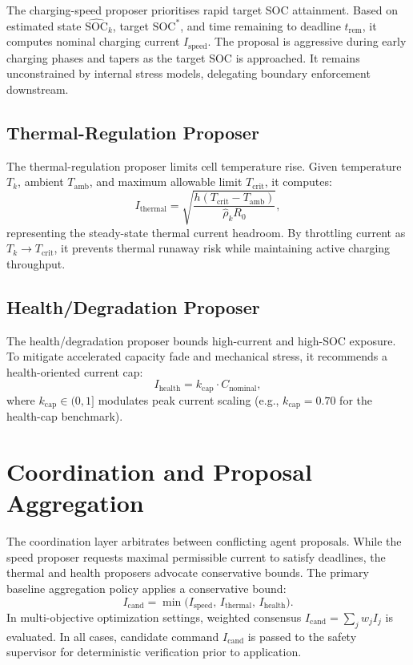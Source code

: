 The charging-speed proposer prioritises rapid target SOC attainment. Based on estimated state $\widehat{\mathrm{SOC}}_k$, target $\mathrm{SOC}^{*}$, and time remaining to deadline $t_{\mathrm{rem}}$, it computes nominal charging current $I_{\mathrm{speed}}$. The proposal is aggressive during early charging phases and tapers as the target SOC is approached. It remains unconstrained by internal stress models, delegating boundary enforcement downstream.

\subsection{Thermal-Regulation Proposer}
\label{subsec:ch5_thermal_agent}

The thermal-regulation proposer limits cell temperature rise. Given temperature $T_k$, ambient $T_{\mathrm{amb}}$, and maximum allowable limit $T_{\mathrm{crit}}$, it computes:
\begin{equation}
  I_{\mathrm{thermal}} = \sqrt{\frac{h (T_{\mathrm{crit}} - T_{\mathrm{amb}})}{\hat{\rho}_k R_0}},
\end{equation}
representing the steady-state thermal current headroom. By throttling current as $T_k \to T_{\mathrm{crit}}$, it prevents thermal runaway risk while maintaining active charging throughput.

\subsection{Health/Degradation Proposer}
\label{subsec:ch5_health_agent}

The health/degradation proposer bounds high-current and high-SOC exposure. To mitigate accelerated capacity fade and mechanical stress, it recommends a health-oriented current cap:
\begin{equation}
  I_{\mathrm{health}} = k_{\mathrm{cap}} \cdot C_{\mathrm{nominal}},
  \label{eq:health_cap}
\end{equation}
where $k_{\mathrm{cap}} \in (0, 1]$ modulates peak current scaling (e.g., $k_{\mathrm{cap}} = 0.70$ for the health-cap benchmark).

\section{Coordination and Proposal Aggregation}
\label{sec:ch5_coordinator}

The coordination layer arbitrates between conflicting agent proposals. While the speed proposer requests maximal permissible current to satisfy deadlines, the thermal and health proposers advocate conservative bounds. The primary baseline aggregation policy applies a conservative bound:
\begin{equation}
  I_{\mathrm{cand}} = \min\bigl(I_{\mathrm{speed}},\, I_{\mathrm{thermal}},\, I_{\mathrm{health}}\bigr).
\end{equation}
In multi-objective optimization settings, weighted consensus $I_{\mathrm{cand}} = \sum_j w_j I_j$ is evaluated. In all cases, candidate command $I_{\mathrm{cand}}$ is passed to the safety supervisor for deterministic verification prior to application.


